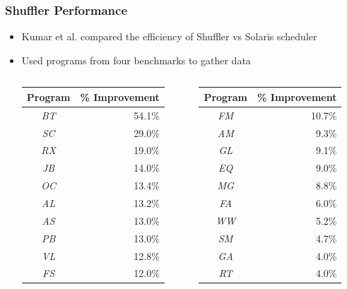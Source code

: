 \documentclass{beamer}
\begin{document}
\begin{frame}
\frametitle{Shuffler Performance}

\begin{itemize}
\item Kumar et al. compared the efficiency of Shuffler vs Solaris scheduler
\item Used programs from four benchmarks to gather data

\begin{columns}

\begin{column}{0.5\textwidth}
\begin{table}
	\centering
	\begin{tabular}{| c | r |}
	\hline
	\textbf{Program} & \textbf{\% Improvement} \\ \hline
	\emph{BT} & 54.1\% \\ \hline
		\emph{SC} & 29.0\% \\ \hline
		\emph{RX} & 19.0\% \\ \hline
		\emph{JB} & 14.0\% \\ \hline
		\emph{OC} & 13.4\% \\ \hline
		\emph{AL} & 13.2\% \\ \hline
		\emph{AS} & 13.0\% \\ \hline
		\emph{PB} & 13.0\% \\ \hline
		\emph{VL} & 12.8\% \\ \hline
		\emph{FS} & 12.0\% \\ \hline
		
\end{tabular}
\end{table}
\end{column}
\begin{column}{0.5\textwidth}
	\begin{table}
	\centering
	\begin{tabular}{| c | r |}
	\hline
	\textbf{Program} & \textbf{\% Improvement} \\ \hline
		\emph{FM} & 10.7\% \\ \hline
		\emph{AM} & 9.3\% \\ \hline
		\emph{GL} & 9.1\% \\ \hline
		\emph{EQ} & 9.0\% \\ \hline
		\emph{MG} & 8.8\% \\ \hline
		\emph{FA} & 6.0\% \\ \hline
		\emph{WW} & 5.2\% \\ \hline
		\emph{SM} & 4.7\% \\ \hline
		\emph{GA} & 4.0\% \\ \hline
		\emph{RT} & 4.0\% \\ \hline
\end{tabular}
\end{table}
\end{column}
\end{columns}
 
\end{itemize}

\end{frame}
\end{document}
